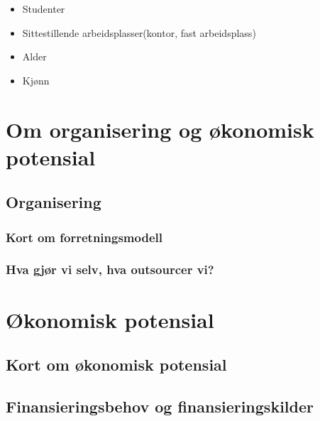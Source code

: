 \begin{itemize}
	\item Studenter
	\item Sittestillende arbeidsplasser(kontor, fast arbeidsplass)
	\item Alder
	\item Kjønn
\end{itemize}

\section{Om organisering og økonomisk potensial}

\subsection{Organisering}

\subsubsection{Kort om forretningsmodell}

\subsubsection{Hva gjør vi selv, hva outsourcer vi?}

\section{Økonomisk potensial}

\subsection{Kort om økonomisk potensial}

\subsection{Finansieringsbehov og finansieringskilder}